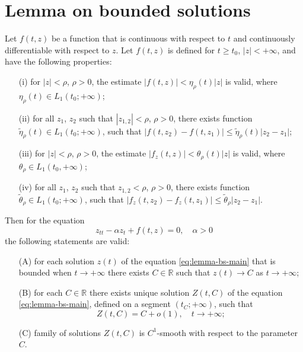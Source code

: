 \appendix
\chapter{Lemma on bounded solutions}
\label{appendix:lemma-on-bounded-solutions}

\begin{lemma*}
	Let $f(t, z)$ be a function that is continuous with respect to $t$ and continuously differentiable with respect to $z$.
	Let $f(t, z)$ is defined for $t \ge t_0$, $|z| < +\infty$, and have the following properties:
	\begin{itemize}
		\item[(i)] for $|z| < \rho$, $\rho > 0$, the estimate $|f(t, z)| < \eta_{\rho}(t)|z|$ is valid, where $\eta_{\rho}(t) \in L_1(t_0; +\infty)$;
		\item[(ii)] for all $z_1$, $z_2$ such that $|z_{1,2}| < \rho$, $\rho > 0$, there exists function $\tilde{\eta}_{\rho}(t) \in L_1(t_0; +\infty)$, such that $|f(t, z_2) - f(t, z_1)| \le \tilde{\eta}_{\rho}(t) |z_2 - z_1|$;
		\item[(iii)] for $|z| < \rho$, $\rho > 0$, the estimate $|f_z(t, z)| < \theta_{\rho}(t) |z|$ is valid, where $\theta_{\rho} \in L_1(t_0, +\infty)$;
		\item[(iv)] for all $z_1$, $z_2$ such that $z_{1,2} < \rho$, $\rho > 0$, there exists function $\tilde{\theta}_{\rho} \in L_1(t_0; +\infty)$, such that $|f_z(t, z_2) - f_z(t, z_1)| \le \tilde{\theta}_{\rho} |z_2 - z_1|$.
	\end{itemize}
	Then for the equation
	\begin{equation}
		z_{tt} - \alpha z_t + f(t, z) = 0, \quad \alpha > 0
		\label{eq:lemma-bs-main}
	\end{equation}
	the following statements are valid:
	\begin{itemize}
		\item[(A)] for each solution $z(t)$ of the equation \eqref{eq:lemma-bs-main} that is bounded when $t \to +\infty$ there exists $C \in \mathbb{R}$ such that $z(t) \to C$ as $t \to +\infty$;
		\item[(B)] for each $C \in \mathbb{R}$ there exists unique solution $Z(t, C)$ of the equation \eqref{eq:lemma-bs-main}, defined on a segment $(t_C; +\infty)$, such that
		\begin{equation}
			Z(t, C) = C + o(1), \quad t \to +\infty;
		\end{equation}
		\item[(C)] family of solutions $Z(t, C)$ is $C^1$-smooth with respect to the parameter $C$.
	\end{itemize}
\end{lemma*}
